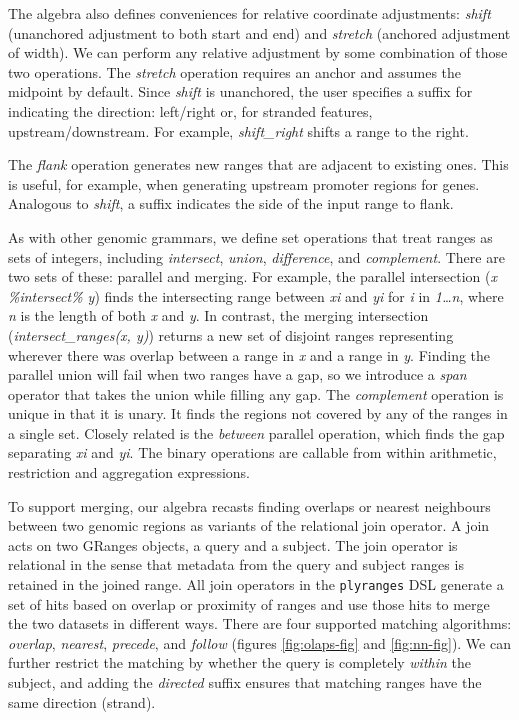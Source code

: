 \documentclass[]{article}
\begin{document}
The algebra also defines conveniences for relative coordinate
adjustments: \emph{shift} (unanchored adjustment to both start and end)
and \emph{stretch} (anchored adjustment of width). We can perform any
relative adjustment by some combination of those two operations. The
\emph{stretch} operation requires an anchor and assumes the midpoint by
default. Since \emph{shift} is unanchored, the user specifies a suffix
for indicating the direction: left/right or, for stranded features,
upstream/downstream. For example, \emph{shift\_right} shifts a range to
the right.

The \emph{flank} operation generates new ranges that are adjacent to
existing ones. This is useful, for example, when generating upstream
promoter regions for genes. Analogous to \emph{shift}, a suffix
indicates the side of the input range to flank.

As with other genomic grammars, we define set operations that treat
ranges as sets of integers, including \emph{intersect}, \emph{union},
\emph{difference}, and \emph{complement}. There are two sets of these:
parallel and merging. For example, the parallel intersection (\emph{x
\%intersect\% y}) finds the intersecting range between \emph{xi} and
\emph{yi} for \emph{i} in \emph{1\ldots{}n}, where \emph{n} is the
length of both \emph{x} and \emph{y}. In contrast, the merging
intersection (\emph{intersect\_ranges(x, y)}) returns a new set of
disjoint ranges representing wherever there was overlap between a range
in \emph{x} and a range in \emph{y}. Finding the parallel union will
fail when two ranges have a gap, so we introduce a \emph{span} operator
that takes the union while filling any gap. The \emph{complement}
operation is unique in that it is unary. It finds the regions not
covered by any of the ranges in a single set. Closely related is the
\emph{between} parallel operation, which finds the gap separating
\emph{xi} and \emph{yi}. The binary operations are callable from within
arithmetic, restriction and aggregation expressions.

To support merging, our algebra recasts finding overlaps or nearest
neighbours between two genomic regions as variants of the relational
join operator. A join acts on two GRanges objects, a query and a
subject. The join operator is relational in the sense that metadata from
the query and subject ranges is retained in the joined range. All join
operators in the \texttt{plyranges} DSL generate a set of hits based on
overlap or proximity of ranges and use those hits to merge the two
datasets in different ways. There are four supported matching
algorithms: \emph{overlap}, \emph{nearest}, \emph{precede}, and
\emph{follow} (figures \ref{fig:olaps-fig} and \ref{fig:nn-fig}). We can
further restrict the matching by whether the query is completely
\emph{within} the subject, and adding the \emph{directed} suffix ensures
that matching ranges have the same direction (strand).
\end{document}
